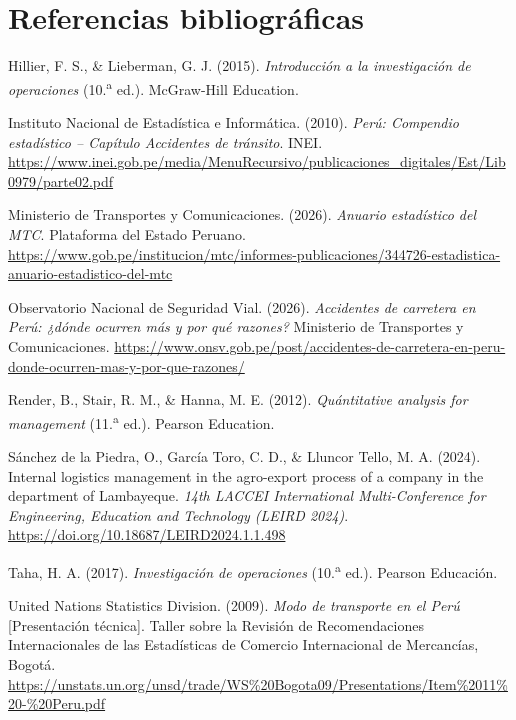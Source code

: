 \documentclass[11pt,a4paper]{article}
\begin{document}
\section{Referencias bibliogr\'aficas}
\begin{flushleft}
\setlength{\parindent}{0pt}
\setlength{\parskip}{8pt}

\hangindent=1cm 
\label{ref:hillier}Hillier, F. S., \& Lieberman, G. J. (2015). \textit{Introducci\'on a la investigaci\'on de operaciones} (10.\textsuperscript{a} ed.). McGraw-Hill Education.

\hangindent=1cm 
Instituto Nacional de Estad\'istica e Inform\'atica. (2010). \textit{Per\'u: Compendio estad\'istico -- Cap\'itulo Accidentes de tr\'ansito}. INEI. \url{https://www.inei.gob.pe/media/MenuRecursivo/publicaciones_digitales/Est/Lib0979/parte02.pdf}

\hangindent=1cm 
Ministerio de Transportes y Comunicaciones. (2026). \textit{Anuario estad\'istico del MTC}. Plataforma del Estado Peruano. \url{https://www.gob.pe/institucion/mtc/informes-publicaciones/344726-estadistica-anuario-estadistico-del-mtc}

\hangindent=1cm 
\label{ref:onsv}Observatorio Nacional de Seguridad Vial. (2026). \textit{Accidentes de carretera en Per\'u: ¿d\'onde ocurren m\'as y por qu\'e razones?} Ministerio de Transportes y Comunicaciones. \url{https://www.onsv.gob.pe/post/accidentes-de-carretera-en-peru-donde-ocurren-mas-y-por-que-razones/}

\hangindent=1cm 
Render, B., Stair, R. M., \& Hanna, M. E. (2012). \textit{Qu\'antitative analysis for management} (11.\textsuperscript{a} ed.). Pearson Education.

\hangindent=1cm 
\label{ref:sanchez}S\'anchez de la Piedra, O., Garc\'ia Toro, C. D., \& Lluncor Tello, M. A. (2024). Internal logistics management in the agro-export process of a company in the department of Lambayeque. \textit{14th LACCEI International Multi-Conference for Engineering, Education and Technology (LEIRD 2024)}. \url{https://doi.org/10.18687/LEIRD2024.1.1.498}

\hangindent=1cm 
Taha, H. A. (2017). \textit{Investigaci\'on de operaciones} (10.\textsuperscript{a} ed.). Pearson Educaci\'on.

\hangindent=1cm 
\label{ref:unsd}United Nations Statistics Division. (2009). \textit{Modo de transporte en el Per\'u} [Presentaci\'on t\'ecnica]. Taller sobre la Revisi\'on de Recomendaciones Internacionales de las Estad\'isticas de Comercio Internacional de Mercanc\'ias, Bogot\'a. \url{https://unstats.un.org/unsd/trade/WS\%20Bogota09/Presentations/Item\%2011\%20-\%20Peru.pdf}


\end{flushleft}
\end{document}
